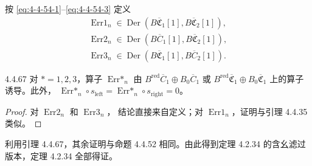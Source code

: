 按 \eqref{eq:4-4-54-1}--\eqref{eq:4-4-54-3} 定义
\[
 \begin{gathered}
 \operatorname{Err1}_n\in
 \operatorname{Der}(B\overline{\mathfrak C}_1[1],
 B\overline{\mathfrak C}_2[1]),\\
 \operatorname{Err2}_n\in
 \operatorname{Der}(B\overline C_1[1],
 B\overline{\mathfrak C}_2[1]),\\
 \operatorname{Err3}_n\in
 \operatorname{Der}(B\overline{\mathfrak C}_1[1],
 B\overline C_2[1]).
 \end{gathered}
\]

\begin{lemma}{4.4.67}\label{lem:4-4-67}
对 $*=1,2,3$，算子 $\operatorname{Err*}_n$ 由
$B^{\mathrm{red}}\overline C_1\oplus B_0\overline C_1$
或
$B^{\mathrm{red}}\overline{\mathfrak C}_1
\oplus B_0\overline{\mathfrak C}_1$
上的算子诱导。此外，
$\operatorname{Err*}_n\circ s_{\mathrm{left}}
=\operatorname{Err*}_n\circ s_{\mathrm{right}}=0$。
\end{lemma}

\begin{proof}
对 $\operatorname{Err2}_n$ 和 $\operatorname{Err3}_n$，
结论直接来自定义；对 $\operatorname{Err1}_n$，证明与引理
4.4.35 类似。
\end{proof}

利用引理 4.4.67，其余证明与命题 4.4.52 相同。由此得到定理
4.2.34 的含幺滤过版本，定理 4.2.34 全部得证。
